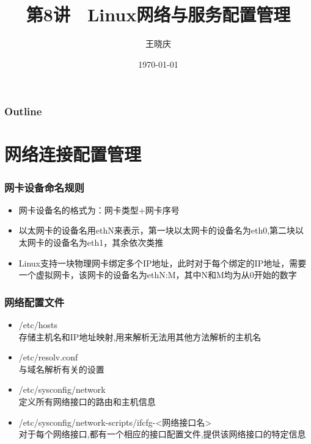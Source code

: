 \documentclass[xcolor=svgnames,presentation]{beamer}
\title{第8讲　Linux网络与服务配置管理}
\author{王晓庆}
\date{\today}
\institute{wangxiaoqing@outlook.com}
\begin{document}
\maketitle

\begin{frame}
\frametitle{Outline}
\setcounter{tocdepth}{1}
\tableofcontents
\end{frame}
\section{网络连接配置管理}
\label{sec-1}
\begin{frame}
\frametitle{网卡设备命名规则}
\label{sec-1-1}
\begin{itemize}

\item 网卡设备名的格式为：网卡类型+网卡序号
\label{sec-1-1-1}%

\item 以太网卡的设备名用ethN来表示，第一块以太网卡的设备名为eth0,第二块以太网卡的设备名为eth1，其余依次类推
\label{sec-1-1-2}%

\item Linux支持一块物理网卡绑定多个IP地址，此时对于每个绑定的IP地址，需要一个虚拟网卡，该网卡的设备名为ethN:M，其中N和M均为从0开始的数字
\label{sec-1-1-3}%
\end{itemize} %
\end{frame}
\begin{frame}
\frametitle{网络配置文件}
\label{sec-1-2}
\begin{itemize}

\item /etc/hosts\\
\label{sec-1-2-1}%
存储主机名和IP地址映射,用来解析无法用其他方法解析的主机名

\item /etc/resolv.conf\\
\label{sec-1-2-2}%
与域名解析有关的设置

\item /etc/sysconfig/network\\
\label{sec-1-2-3}%
定义所有网络接口的路由和主机信息

\item /etc/sysconfig/network-scripts/ifcfg-<网络接口名>\\
\label{sec-1-2-4}%
对于每个网络接口,都有一个相应的接口配置文件,提供该网络接口的特定信息
\end{itemize} %
\end{frame}
\end{document}
